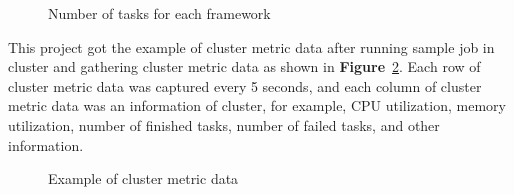 \documentclass[12pt,oneside,openright,a4paper]{cpe-english-project}
\begin{document}
\begin{figure}[!h]\centering
    \setlength{\fboxrule}{0mm} %
    \setlength{\fboxsep}{0cm}
    \caption{Number of tasks for each framework}\label{fig:task0}
\end{figure}

\newpage

\hspace{10mm}This project got the example of cluster metric data after running sample job in cluster and gathering cluster metric data as shown in \textbf{Figure}~\ref{fig:exampleData}. Each row of cluster metric data was captured every 5 seconds, and each column of cluster metric data was an information of cluster, for example, CPU utilization, memory utilization, number of finished tasks, number of failed tasks, and other information.
\begin{figure}[!h]\centering
    \setlength{\fboxrule}{0mm} %
    \setlength{\fboxsep}{0cm}
    \caption{Example of cluster metric data}\label{fig:exampleData}
\end{figure}
\end{document}
